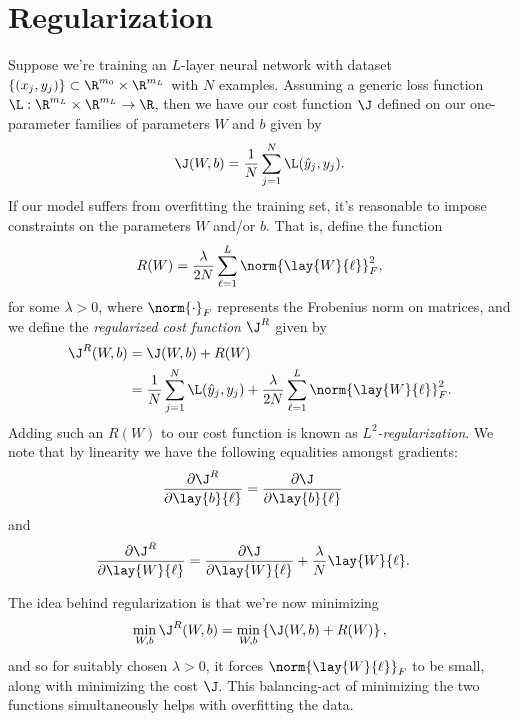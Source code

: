 

\section{Regularization}

Suppose we're training an $L$-layer neural network with dataset $\{(x_j,y_j)\}\subset\R^{m_0}\times\R^{m_L}$ with $N$ examples.  Assuming a generic loss function $\L:\R^{m_L}\times\R^{m_L}\to\R$, then we have our cost function $\J$ defined on our one-parameter families of parameters $W$ and $b$ given by
$$\J(W,b)=\frac{1}{N}\sum_{j=1}^N\L(\hat{y}_j,y_j).$$
If our model suffers from overfitting the training set, it's reasonable to impose constraints on the parameters $W$ and/or $b$.  That is, define the function
$$R(W)=\frac{\lambda}{2N}\sum_{\ell=1}^L\norm{\lay{W}{\ell}}_F^2,$$
for some $\lambda>0$, where $\norm{\cdot}_F$ represents the Frobenius norm on matrices, and we define the \textit{regularized cost function} $\J^R$ given by
\begin{align*}
	\J^R(W,b)&=\J(W,b)+R(W)\\
	&=\frac{1}{N}\sum_{j=1}^N\L(\hat{y}_j,y_j)+\frac{\lambda}{2N}\sum_{\ell=1}^L\norm{\lay{W}{\ell}}_F^2.
\end{align*}
Adding such an $R(W)$ to our cost function is known as \textit{$L^2$-regularization}.  We note that by linearity we have the following equalities amongst gradients:
\begin{align*}
	\frac{\partial\J^R}{\partial\lay{b}{\ell}}&=\frac{\partial\J}{\partial\lay{b}{\ell}}
\end{align*}
and
\begin{align*}
	\frac{\partial\J^R}{\partial\lay{W}{\ell}}&=\frac{\partial\J}{\partial\lay{W}{\ell}}+\frac{\lambda}{N}\lay{W}{\ell}.
\end{align*}

The idea behind regularization is that we're now minimizing
$$\min_{W,b}\J^R(W,b)=\min_{W,b}\left\{\J(W,b)+R(W)\right\},$$
and so for suitably chosen $\lambda>0$, it forces $\norm{\lay{W}{\ell}}_F$ to be small, along with minimizing the cost $\J$.  This balancing-act of minimizing the two functions simultaneously helps with overfitting the data.

